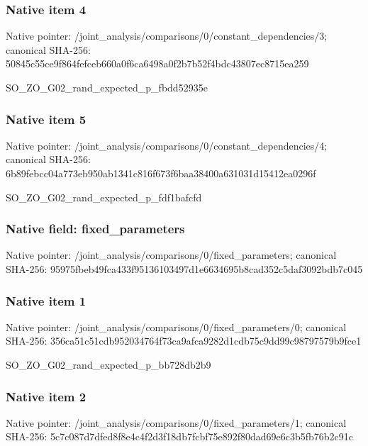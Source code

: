 \documentclass[10pt,a4paper]{article}
\begin{document}
\subsubsection{Native item 4}
Native pointer: /joint\_\allowbreak{}analysis/comparisons/0/constant\_\allowbreak{}dependencies/3; canonical SHA-256: 50845c55ce9f864fefceb660a0f6ca6498a0f2b7b52f4bdc43807ec8715ea259

\begingroup\raggedright\sloppy SO\_\allowbreak{}ZO\_\allowbreak{}G02\_\allowbreak{}rand\_\allowbreak{}expected\_\allowbreak{}p\_\allowbreak{}fbdd52935e\par\endgroup

\subsubsection{Native item 5}
Native pointer: /joint\_\allowbreak{}analysis/comparisons/0/constant\_\allowbreak{}dependencies/4; canonical SHA-256: 6b89febcc04a773eb950ab1341c816f673f6baa38400a631031d15412ea0296f

\begingroup\raggedright\sloppy SO\_\allowbreak{}ZO\_\allowbreak{}G02\_\allowbreak{}rand\_\allowbreak{}expected\_\allowbreak{}p\_\allowbreak{}fdf1bafcfd\par\endgroup

\subsubsection{Native field: fixed\_\allowbreak{}parameters}
Native pointer: /joint\_\allowbreak{}analysis/comparisons/0/fixed\_\allowbreak{}parameters; canonical SHA-256: 95975fbeb49fca433f95136103497d1e6634695b8cad352c5daf3092bdb7c045

\subsubsection{Native item 1}
Native pointer: /joint\_\allowbreak{}analysis/comparisons/0/fixed\_\allowbreak{}parameters/0; canonical SHA-256: 356ca51c51cdb952034764f73ca9afca9282d1cdb75c9dd99c98797579b9fce1

\begingroup\raggedright\sloppy SO\_\allowbreak{}ZO\_\allowbreak{}G02\_\allowbreak{}rand\_\allowbreak{}expected\_\allowbreak{}p\_\allowbreak{}bb728db2b9\par\endgroup

\subsubsection{Native item 2}
Native pointer: /joint\_\allowbreak{}analysis/comparisons/0/fixed\_\allowbreak{}parameters/1; canonical SHA-256: 5c7c087d7dfed8f8e4c4f2d3f18db7fcbf75e892f80dad69e6c3b5fb76b2c91c
\end{document}
